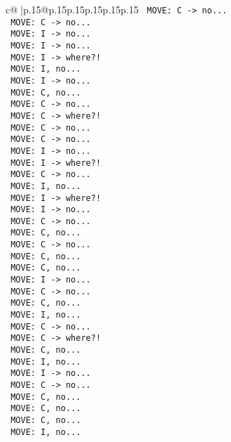\documentclass{article}
\begin{document}
{\begin{supertabular}{c@{$\;$}|p{.15\linewidth}@{}p{.15\linewidth}p{.15\linewidth}p{.15\linewidth}p{.15\linewidth}p{.15\linewidth}}
{{{\texttt{ MOVE: C {-}> no...} \\
\texttt{ MOVE: C {-}> no...} \\
\texttt{ MOVE: I {-}> no...} \\
\texttt{ MOVE: I {-}> no...} \\
\texttt{ MOVE: I {-}> where?!} \\
\texttt{ MOVE: I, no...} \\
\texttt{ MOVE: I {-}> no...} \\
\texttt{ MOVE: C, no...} \\
\texttt{ MOVE: C {-}> no...} \\
\texttt{ MOVE: C {-}> where?!} \\
\texttt{ MOVE: C {-}> no...} \\
\texttt{ MOVE: C {-}> no...} \\
\texttt{ MOVE: I {-}> no...} \\
\texttt{ MOVE: I {-}> where?!} \\
\texttt{ MOVE: C {-}> no...} \\
\texttt{ MOVE: I, no...} \\
\texttt{ MOVE: I {-}> where?!} \\
\texttt{ MOVE: I {-}> no...} \\
\texttt{ MOVE: C {-}> no...} \\
\texttt{ MOVE: C, no...} \\
\texttt{ MOVE: C {-}> no...} \\
\texttt{ MOVE: C, no...} \\
\texttt{ MOVE: C, no...} \\
\texttt{ MOVE: I {-}> no...} \\
\texttt{ MOVE: C {-}> no...} \\
\texttt{ MOVE: C, no...} \\
\texttt{ MOVE: I, no...} \\
\texttt{ MOVE: C {-}> no...} \\
\texttt{ MOVE: C {-}> where?!} \\
\texttt{ MOVE: C, no...} \\
\texttt{ MOVE: I, no...} \\
\texttt{ MOVE: I {-}> no...} \\
\texttt{ MOVE: C {-}> no...} \\
\texttt{ MOVE: C, no...} \\
\texttt{ MOVE: C, no...} \\
\texttt{ MOVE: C, no...} \\
\texttt{ MOVE: I, no...} \\
}}}
\end{supertabular}}
\end{document}
